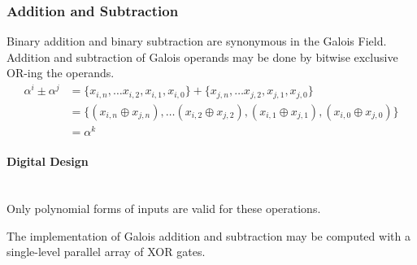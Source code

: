 \subsubsection{Addition and Subtraction} Binary addition and binary subtraction
are synonymous in the Galois Field. Addition and subtraction of Galois operands
may be done by bitwise exclusive OR-ing the operands.
    \begin{equation*}
        \begin{split}
            \alpha^{i} \pm \alpha^{j} & = \{ x_{i, n}, \ldots x_{i, 2},
            x_{i, 1}, x_{i, 0} \} + \{ x_{j, n}, \ldots x_{j, 2}, x_{j, 1},
            x_{j, 0} \} \\
            & = \{(x_{i, n} \oplus x_{j,n}), \ldots (x_{i, 2} \oplus x_{j,
            2}), (x_{i, 1}\oplus x_{j, 1}), (x_{i, 0}\oplus x_{j, 0})\} \\
            & = \alpha^{k}
        \end{split}
    \end{equation*}

    \paragraph{{\small Digital Design}} \leavevmode \\ Only polynomial forms of
    inputs are valid for these operations.

    The implementation of Galois addition and subtraction may be computed with
    a single-level parallel array of XOR gates.
